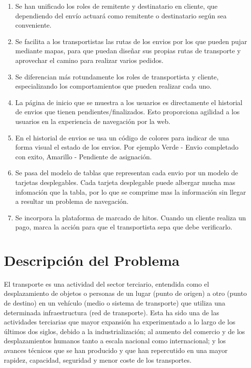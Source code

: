 \documentclass[10pt, a4paper,spanish]{article}
\begin{document}
				\begin{enumerate}
					\item Se han unificado los roles de remitente y destinatario en cliente, que dependiendo del envío actuará como remitente o destinatario según sea conveniente.

					\item Se facilita a los transportistas las rutas de los envios por los que pueden pujar mediante mapas, para que puedan diseñar sus propias rutas de transporte y aprovechar el camino para realizar varios pedidos.

					\item Se diferencian más rotundamente los roles de transportista y cliente, especializando los comportamientos que pueden realizar cada uno.

					\item La página de inicio que se muestra a los usuarios es directamente el historial de envios que tienen pendientes/finalizados. Esto proporciona agilidad a los usuarios en la experiencia de navegación por la web.

					\item En el historial de envios se usa un código de colores para indicar de una forma visual el estado de los envios. Por ejemplo Verde - Envio completado con exito, Amarillo - Pendiente de asignación.

					\item Se pasa del modelo de tablas que representan cada envio por un modelo de tarjetas desplegables. Cada tarjeta desplegable puede albergar mucha mas infomación que la tabla, por lo que se comprime mas la información sin llegar a resultar un problema de navegación.

					\item Se incorpora la plataforma de marcado de hitos. Cuando un cliente realiza un pago, marca la acción para que el transportista sepa que debe verificarlo.
				\end{enumerate}



		\section{Descripción del Problema}

			\paragraph{}
			El transporte es una actividad del sector terciario, entendida como el desplazamiento de objetos o personas de un lugar (punto de origen) a otro (punto de destino) en un vehículo (medio o sistema de transporte) que utiliza una determinada infraestructura (red de transporte). Esta ha sido una de las actividades terciarias que mayor expansión ha experimentado a lo largo de los últimos dos siglos, debido a la industrialización; al aumento del comercio y de los desplazamientos humanos tanto a escala nacional como internacional; y los avances técnicos que se han producido y que han repercutido en una mayor rapidez, capacidad, seguridad y menor coste de los transportes. \cite{wikipedia_transporte}
\end{document}
